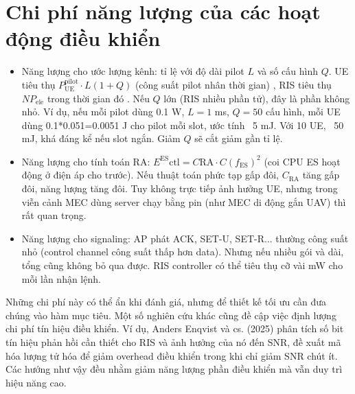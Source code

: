 \section{Chi phí năng lượng của các hoạt động điều khiển}

\begin{itemize}
    \item Năng lượng cho ước lượng kênh: tỉ lệ với độ dài pilot $L$ và số cấu hình $Q$. UE tiêu thụ $P_\text{UE}^\text{pilot} \cdot L (1+Q)$ (công suất pilot nhân thời gian) , RIS tiêu thụ $N P_\text{ele}$ trong thời gian đó . Nếu $Q$ lớn (RIS nhiều phần tử), đây là phần không nhỏ. Ví dụ, nếu mỗi pilot dùng 0.1 W, $L=1$ ms, $Q=50$ cấu hình, mỗi UE dùng 0.1*0.051=0.0051 J cho pilot mỗi slot, ước tính ~5 mJ. Với 10 UE, ~50 mJ, khá đáng kể nếu slot ngắn. Giảm $Q$ sẽ cắt giảm gần tỉ lệ.
    \item Năng lượng cho tính toán RA: $E^\text{ES}\text{ctl} = C\text{RA} \cdot C (f_\text{ES})^2$ (coi CPU ES hoạt động ở điện áp cho trước). Nếu thuật toán phức tạp gấp đôi, $C_\text{RA}$ tăng gấp đôi, năng lượng tăng đôi. Tuy không trực tiếp ảnh hưởng UE, nhưng trong viễn cảnh MEC dùng server chạy bằng pin (như MEC di động gắn UAV) thì rất quan trọng.
    \item Năng lượng cho signaling: AP phát ACK, SET-U, SET-R... thường công suất nhỏ (control channel công suất thấp hơn data). Nhưng nếu nhiều gói và dài, tổng cũng không bỏ qua được. RIS controller có thể tiêu thụ cỡ vài mW cho mỗi lần nhận lệnh.
\end{itemize}


Những chi phí này có thể ẩn khi đánh giá, nhưng để thiết kế tối ưu cần đưa chúng vào hàm mục tiêu. Một số nghiên cứu khác cũng đề cập việc định lượng chi phí tín hiệu điều khiển. Ví dụ, Anders Enqvist và cs. (2025) phân tích số bit tín hiệu phản hồi cần thiết cho RIS và ảnh hưởng của nó đến SNR, đề xuất mã hóa lượng tử hóa để giảm overhead điều khiển trong khi chỉ giảm SNR chút ít. Các hướng như vậy đều nhằm giảm năng lượng phần điều khiển mà vẫn duy trì hiệu năng cao.